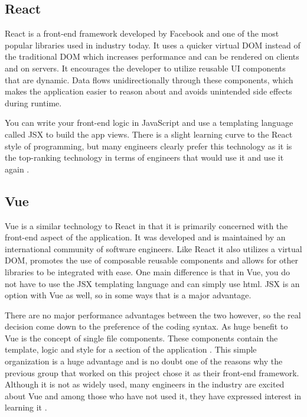 \documentclass[draftclsnofoot,onecolumn,journal,letterpaper,compsoc,10pt]{IEEEtran}
\begin{document}
        \subsection{React}
        React is a front-end framework developed by Facebook and one of the most popular libraries used in industry today. It uses a quicker virtual DOM instead of the traditional DOM which increases performance and can be rendered on clients and on servers. It encourages the developer to utilize reusable UI components that are dynamic. Data flows unidirectionally through these components, which makes the application easier to reason about and avoids unintended side effects during runtime. 
        
        You can write your front-end logic in JavaScript and use a templating language called JSX to build the app views. There is a slight learning curve to the React style of programming, but many engineers clearly prefer this technology as it is the top-ranking technology in terms of engineers that would use it and use it again \cite{stateofjs2017}.

        \subsection{Vue}
        Vue is a similar technology to React in that it is primarily concerned with the front-end aspect of the application. It was developed and is maintained by an international community of software engineers. Like React it also utilizes a virtual DOM, promotes the use of composable reusable components and allows for other libraries to be integrated with ease. One main difference is that in Vue, you do not have to use the JSX templating language and can simply use html. JSX is an option with Vue as well, so in some ways that is a major advantage. 
        
        There are no major performance advantages between the two however, so the real decision come down to the preference of the coding syntax. As huge benefit to Vue is the concept of single file components. These components contain the template, logic and style for a section of the application \cite{vue}. This simple organization is a huge advantage and is no doubt one of the reasons why the previous group that worked on this project chose it as their front-end framework. Although it is not as widely used, many engineers in the industry are excited about Vue and among those who have not used it, they have expressed interest in learning it \cite{stateofjs2017}.
\end{document}

